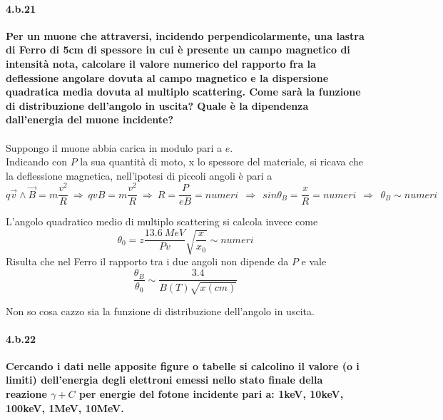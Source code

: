 \documentclass[twoside]{article}
\begin{document}
\begin{itemize}
\end{itemize}
\paragraph{4.b.21}\textbf{Per un muone che attraversi, incidendo perpendicolarmente, una lastra di Ferro di
5cm di spessore in cui è presente un campo magnetico di intensità nota, calcolare
il valore numerico del rapporto fra la deflessione angolare dovuta al campo
magnetico e la dispersione quadratica media dovuta al multiplo scattering. Come
sarà la funzione di distribuzione dell’angolo in uscita? Quale è la dipendenza
dall’energia del muone incidente?} \\ \\

Suppongo il muone abbia carica in modulo pari a $e$.
\\
Indicando con $P$ la sua quantità di moto, x lo spessore del materiale, si ricava che la deflessione magnetica, nell'ipotesi di piccoli angoli è pari a
\begin{equation}
   q\vec{v}\wedge \vec{B}=m\frac{v^2}{R} \ \Rightarrow \ qvB=m\frac{v^2}{R} \ \Rightarrow \ R=\frac{P}{eB}=numeri \ \ \Rightarrow \ \ sin\theta_B=\frac{x}{R}=numeri \ \ \Rightarrow \ \ \theta_B \sim numeri
\end{equation}

L'angolo quadratico medio di multiplo scattering si calcola invece come
\begin{equation}
    \theta_0=z\frac{13.6 \ MeV}{Pv}\sqrt{\frac{x}{x_0}}\sim numeri
\end{equation}
Risulta che nel Ferro il rapporto tra i due angoli non dipende da $P$ e vale
\begin{equation}
    \frac{\theta_B}{\theta_0}\sim \frac{3.4}{B(T)\sqrt{x(cm)}}
\end{equation}

Non so cosa cazzo sia la funzione di distribuzione dell'angolo in uscita.



\paragraph{4.b.22}\textbf{Cercando i dati nelle apposite figure o tabelle si calcolino il valore (o i limiti)
dell'energia degli elettroni emessi nello stato finale della reazione $\gamma + C$ per
energie del fotone incidente pari a: 1keV, 10keV, 100keV, 1MeV, 10MeV.} \\ \\
\end{document}

